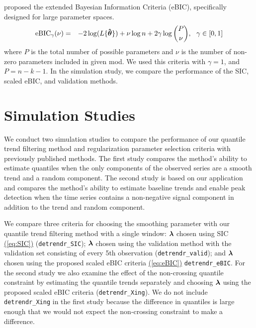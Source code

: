 \documentclass[aoas]{imsart}
\newcommand{\Eqn}[1]{\hyperref[eq:#1]{{\rm (\ref*{eq:#1})}}} %
\newcommand{\Eqn}[1]{{(\ref{eq:#1})}} %
\newcommand{\V}[1]{{\bm{\mathbf{\MakeLowercase{#1}}}}} %
\newcommand{\Vhat}[1]{{\bm{\hat \mathbf{\MakeLowercase{#1}}}}} %
\newcommand{\M}[1]{{\bm{\mathbf{\MakeUppercase{#1}}}}} %
\begin{document}
\cite{chen2008} proposed the extended Bayesian Information Criteria (eBIC), specifically designed for large parameter spaces.
\begin{eqnarray*}
	\label{eq:eBIC}
	\mbox{eBIC}_{\gamma}(\nu) & = & -2\log(L\{\Vhat{\theta}\}) + \nu\log n  + 2\gamma\log{P \choose \nu},~~\gamma \in [0,1]
\end{eqnarray*}
where $P$ is the total number of possible parameters and $\nu$ is the number of non-zero parameters included in given mod. We used this criteria with $\gamma = 1$, and $P=n-k-1$. In the simulation study, we compare the performance of the SIC, scaled eBIC, and validation methods. 


\section{Simulation Studies}
\label{sec:simluation}

We conduct two simulation studies to compare the performance of our quantile trend filtering method and regularization parameter selection criteria with previously published methods. The first study compares the method's ability to estimate quantiles when the only components of the observed series are a smooth trend and a random component. The second study is based on our application and compares the method's ability to estimate baseline trends and enable peak detection when the time series contains a non-negative signal component in addition to the trend and random component.

We compare three criteria for choosing the smoothing parameter with our quantile trend filtering method with a single window:  $\V{\lambda}$ chosen using SIC \Eqn{SIC} \citep{KoenkerNgPortnoy1994} (\texttt{detrendr\_SIC}); $\V{\lambda}$ chosen using the validation method with the validation set consisting of every 5th observation (\texttt{detrendr\_valid}); and $\V{\lambda}$ chosen using the proposed scaled eBIC criteria \Eqn{eBIC} \texttt{detrendr\_eBIC}. For the second study we also examine the effect of the non-crossing quantile constraint by estimating the quantile trends separately and choosing $\V{\lambda}$ using the proposed scaled eBIC criteria (\texttt{detrendr\_Xing}). We do not include \texttt{detrendr\_Xing} in the first study because the difference in quantiles is large enough that we would not expect the non-crossing constraint to make a difference. 
\end{document}
